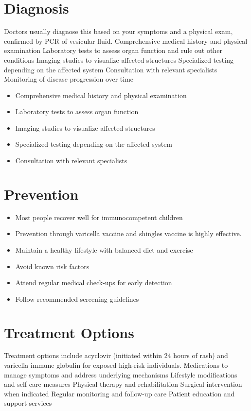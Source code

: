 \section{Diagnosis}
Doctors usually diagnose this based on your symptoms and a physical exam, confirmed by PCR of vesicular fluid. Comprehensive medical history and physical examination Laboratory tests to assess organ function and rule out other conditions Imaging studies to visualize affected structures Specialized testing depending on the affected system Consultation with relevant specialists Monitoring of disease progression over time

\begin{itemize}[noitemsep]
  \item Comprehensive medical history and physical examination
  \item Laboratory tests to assess organ function
  \item Imaging studies to visualize affected structures
  \item Specialized testing depending on the affected system
  \item Consultation with relevant specialists
\end{itemize}
\section{Prevention}
\begin{itemize}[noitemsep]
  \item Most people recover well for immunocompetent children
  \item Prevention through varicella vaccine and shingles vaccine is highly effective.
  \item Maintain a healthy lifestyle with balanced diet and exercise
  \item Avoid known risk factors
  \item Attend regular medical check-ups for early detection
  \item Follow recommended screening guidelines
\end{itemize}
\section{Treatment Options}
Treatment options include acyclovir (initiated within 24 hours of rash) and varicella immune globulin for exposed high-risk individuals. Medications to manage symptoms and address underlying mechanisms Lifestyle modifications and self-care measures Physical therapy and rehabilitation Surgical intervention when indicated Regular monitoring and follow-up care Patient education and support services

